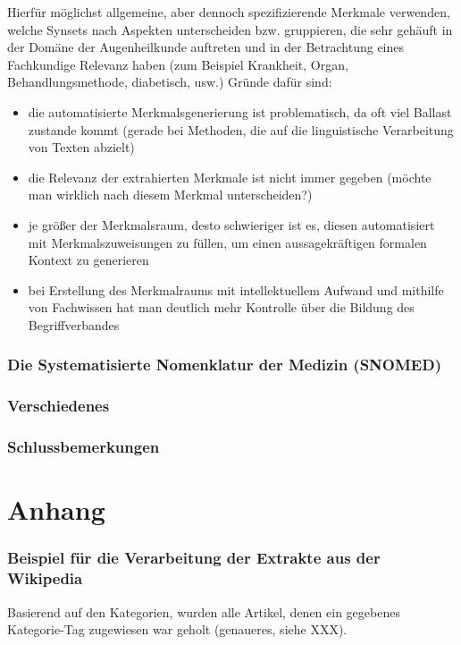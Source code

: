 \documentclass[pagesize,DIV=calc,12pt,draft]{scrreprt}
\begin{document}
Hierfür möglichst allgemeine, aber dennoch spezifizierende Merkmale verwenden, welche Synsets nach Aspekten unterscheiden bzw. gruppieren, die sehr gehäuft in der Domäne der Augenheilkunde auftreten und in der Betrachtung eines Fachkundige Relevanz haben (zum Beispiel Krankheit, Organ, Behandlungsmethode, diabetisch, usw.) 
Gründe dafür sind:
\begin{itemize}
\item die automatisierte Merkmalsgenerierung ist problematisch, da oft viel Ballast zustande kommt (gerade bei Methoden, die auf die linguistische Verarbeitung von Texten abzielt)
\item die Relevanz der extrahierten Merkmale ist nicht immer gegeben (möchte man wirklich nach diesem Merkmal unterscheiden?)
\item je größer der Merkmalsraum, desto schwieriger ist es, diesen automatisiert mit Merkmalszuweisungen zu füllen, um einen aussagekräftigen formalen Kontext zu generieren
\item bei Erstellung des Merkmalraums mit intellektuellem Aufwand und mithilfe von Fachwissen hat man deutlich mehr Kontrolle über die Bildung des Begriffverbandes
\end{itemize}

\subsection{Die Systematisierte Nomenklatur der Medizin (SNOMED)}

\subsection{Verschiedenes}

\subsection{Schlussbemerkungen}

\chapter{Anhang}

\subsection{Beispiel für die Verarbeitung der Extrakte aus der Wikipedia}

Basierend auf den Kategorien, wurden alle Artikel, denen ein gegebenes Kategorie-Tag zugewiesen war geholt (genaueres, siehe XXX).
\end{document}
